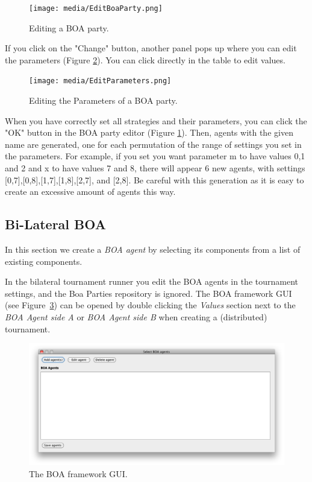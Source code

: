 \documentclass[]{article}
\begin{document}
\begin{figure}[!ht] 
	\center
	\texttt{[image: media/EditBoaParty.png]}
	\caption{Editing a BOA party.}
	\label{fig:editboaparty}
\end{figure}

If you click on the  "Change" button, another panel pops up where you can edit the parameters (Figure \ref{fig:editparameters}). You can click directly in the table to edit values.

\begin{figure}[!ht] 
	\center
	\texttt{[image: media/EditParameters.png]}
	\caption{Editing the Parameters of a BOA party.}
	\label{fig:editparameters}
\end{figure}

When you have correctly set all strategies and their parameters, you can click the "OK" button in the BOA party editor (Figure  \ref{fig:editboaparty}). Then, agents with the given name are generated, one for each permutation of the range of settings you set in the parameters. For example, if you set you want parameter m to have values 0,1 and 2 and x to have values 7 and 8, there will appear 6 new agents, with settings [0,7],[0,8],[1,7],[1,8],[2,7], and [2,8]. Be careful with this generation as it is easy to create an excessive amount of agents this way.

\subsection{Bi-Lateral BOA}

In this section we create a \textit{BOA agent} by selecting its components from a list of existing components. 

In the bilateral tournament runner you edit the BOA agents in the tournament settings, and the Boa Parties repository is ignored. The BOA framework GUI (see Figure~\ref{fig:decoupledGUI}) can be opened by double clicking the \textit{Values} section next to the \textit{BOA Agent side A} or \textit{BOA Agent side B} when creating a (distributed) tournament.




\begin{figure}[h!]
	\center
	\includegraphics[width=15cm]{media/BOAgui.png}
	\caption{The BOA framework GUI.}
	\label{fig:decoupledGUI}
\end{figure}
\end{document}
